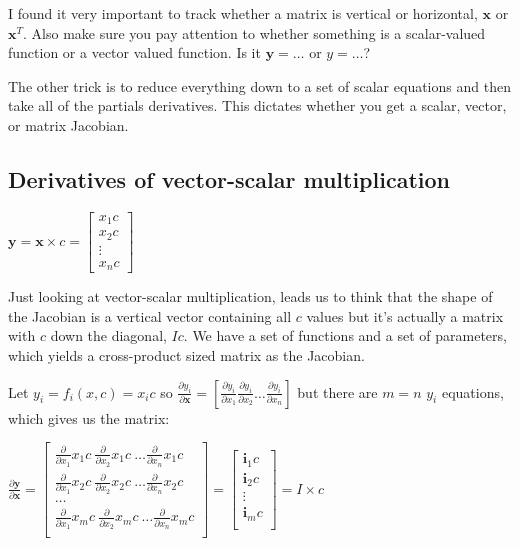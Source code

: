 \documentclass[11pt]{article}
\begin{document}
I found it very important to track whether a matrix is vertical or horizontal, $\mathbf{x}$ or $\mathbf{x}^T$. Also make sure you pay attention to whether something is a scalar-valued function or a vector valued function. Is it $\mathbf{y} = \ldots$ or $y = \ldots$?

The other trick is to reduce everything down to a set of scalar equations and then take all of the partials derivatives. This dictates whether you get a scalar, vector, or matrix Jacobian.

\subsection{Derivatives of vector-scalar multiplication}

$\mathbf{y} = \mathbf{x} \times c = \begin{bmatrix}
           x_{1} c\\
           x_{2} c\\
           \vdots \\
           x_{n} c
         \end{bmatrix}$

Just looking at vector-scalar multiplication, leads us to think that the shape of the Jacobian is a vertical vector containing all $c$ values but it's actually a matrix with $c$ down the diagonal, $I c$. We have a set of functions and a set of parameters, which yields a cross-product sized matrix as the Jacobian.

Let $y_i = f_i(x,c) = x_i c$ so $\frac{\partial y_i}{\partial {\mathbf{x}}} = [ \frac{\partial y_i}{\partial x_1} \frac{\partial y_i}{\partial x_2} \ldots \frac{\partial y_i}{\partial x_n} ]$ but there are $m=n$ $y_i$ equations,  which gives us the matrix:

$\frac{\partial \mathbf{y}}{\partial \mathbf{x}} =  \begin{bmatrix}
\frac{\partial}{\partial {x_1}} x_1 c~ \frac{\partial}{\partial {x_2}} x_1 c~ \ldots \frac{\partial}{\partial {x_n}} x_1 c \\
\frac{\partial}{\partial {x_1}} x_2 c~\frac{\partial}{\partial {x_2}} x_2 c~ \ldots \frac{\partial}{\partial {x_n}} x_2 c \\
\ldots\\
\frac{\partial}{\partial {x_1}} x_m c~ \frac{\partial}{\partial {x_2}} x_m c~ \ldots \frac{\partial}{\partial {x_n}} x_m c\\
\end{bmatrix} = \begin{bmatrix}
           \mathbf{i}_1 c\\
           \mathbf{i}_2 c\\
           \vdots \\
           \mathbf{i}_m c\\
           \end{bmatrix} = I \times c$
\end{document}
